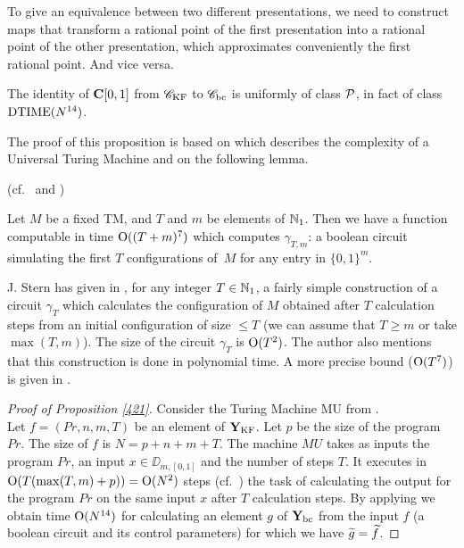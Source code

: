 To give an equivalence between two different presentations, we need to 
construct maps that transform a rational point of the first presentation into a rational point of the other presentation, which approximates conveniently the first rational point. And vice versa.

\begin{proposition} \label{421}
The identity of ${{\bf C}[0,1]}$ from ${{{\mathscr C}}_{\rm KF}}$ to ${{{\mathscr C}}_{\rm bc}}$ is uniformly of class ${\cal P}$, in fact of class  ${\rm DTIME} (N^{14})$.
\end{proposition}

The proof of this proposition is based on  which describes 
the complexity of a Universal Turing Machine and on the following lemma.
\begin{lemma} \label{422}
{\rm (cf.\ \cite{St} and \cite{Mo}) } 

\noindent 
Let $ M $ be a fixed TM, and $ T $ and $ m $ be elements of 
$\mathbb {N}_1$. Then we have a function computable in time ${\rm O}((T+m)^7)$ which computes 
$\gamma_{T,m}$: a boolean circuit simulating the first $ T $ configurations of~$M$ for any entry in $\{0,1\}^m$.
\end{lemma} 

\begin{remark} \label{423}
J. Stern has given in \cite {St}, for any integer $T \in \mathbb {N}_1$, a fairly simple construction of a circuit $\gamma_T$ which calculates the configuration of $M$ obtained after $T$ calculation steps from an initial configuration of size $\leq T$ (we can assume that $T \geq m$ or take $\max(T,m)$). The size of the circuit $\gamma_T$ is ${\rm O}(T^2)$. The author also mentions that this construction is done in polynomial time. A more precise bound (${\rm O}(T^7)$) is given in \cite{Mo}.
\end{remark}

\begin{proof}[Proof of Proposition \ref{421}] Consider the Turing Machine 
 MU from .\\ Let $f=(Pr,n,m,T)$ be an element of 
${{\bf Y}_{\rm KF}}$. Let $ p $ be the size of the program $Pr$. 
The size of $f$ is $N = p+n+m+T.$ The machine $ MU $ takes as inputs the program $ Pr $, an input $ x \in \DD_{m,[0,1]}$ and the number of steps $T$. 
It executes in ${\rm O}(T (\max(T,m)+p)) = {\rm O}(N^2)$ steps (cf.\ ) the task of calculating the output for the program $Pr$ on the same input $x$ after $T$ calculation steps. 
By applying  we obtain time ${\rm O}(N^{14})$ for 
calculating an element $g$ of ${{\bf Y}_{\rm bc}}$ from the input $f$ 
(a boolean circuit and its control parameters) 
for which we have $\widetilde{g} = \widetilde{f}$. 
\end{proof}


